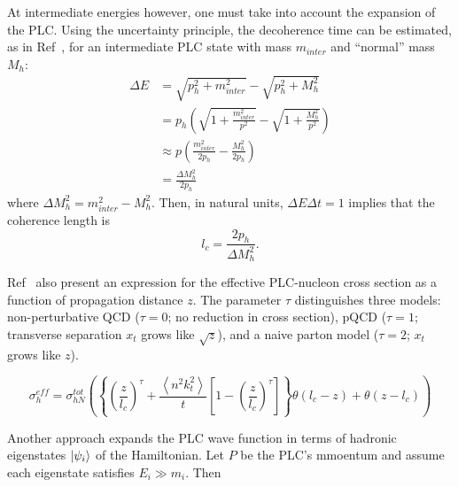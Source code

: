 At intermediate energies however, one must take into account the expansion of
the PLC.
Using the uncertainty principle, the decoherence time can be
estimated, as in Ref~\cite{Farrar_1988}, for an intermediate PLC state with mass
$m_{inter}$ and ``normal'' mass $M_h$:
\begin{align}
    \Delta E &= \sqrt{p_h^2 + m_{inter}^2} - \sqrt{p_h^2 + M_h^2} \\
             &= p_h \left( \sqrt{1+\frac{m_{inter}^2}{p^2}} -
                           \sqrt{1+\frac{M_h^2}{p^2}} \right) \\
             &\approx p \left( \frac{m_{inter}^2}{2p_h} - \frac{M_h^2}{2p_h} \right) \\
             &= \frac{\Delta M_h^2}{2p_h}
\end{align}
where $\Delta M_h^2 = m_{inter}^2 - M_h^2$.
Then, in natural units, $\Delta E \Delta t = 1$ implies that the coherence
length is
\begin{equation}
    l_c = \frac{2p_h}{\Delta M_h^2}.
\end{equation}


Ref~\cite{Farrar_1988} also present an expression for the effective PLC-nucleon
cross section as a function of propagation distance $z$.
The parameter $\tau$ distinguishes three models:
non-perturbative QCD ($\tau=0$; no reduction in cross section),
pQCD ($\tau=1$; transverse separation $x_t$ grows like $\sqrt{z}$),
and a naive parton model ($\tau=2$; $x_t$ grows like $z$).

\begin{equation}
    \sigma_{h}^{eff} = \sigma_{hN}^{tot}
    \left(
        \left\{\left(\frac{z}{l_c}\right)^{\tau} +
               \frac{\left\langle n^{2} k_{t}^{2}\right\rangle}{t} \left[1-\left(\frac{z}{l_c}\right)^{\tau}\right]
        \right\}
        \theta\left(l_c-z\right) +
        \theta\left(z-l_c\right)
    \right)
\end{equation}


Another approach expands the PLC wave function in terms of hadronic eigenstates
$\ket{\psi_i}$ of the Hamiltonian.
Let $P$ be the PLC's mmoentum and assume each eigenstate satisfies
$E_i \gg m_i$.
Then

